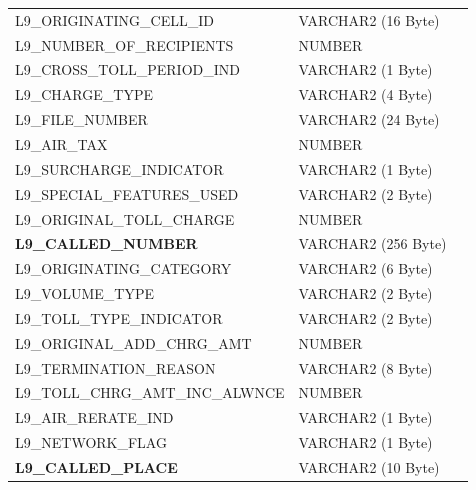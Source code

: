 \documentclass[12pt,twoside]{article}
\begin{document}
\begin{longtable}{lll}
 L9\_ORIGINATING\_CELL\_ID               &  VARCHAR2 (16 Byte)   &                            \\
 L9\_NUMBER\_OF\_RECIPIENTS              &  NUMBER               &                            \\
 L9\_CROSS\_TOLL\_PERIOD\_IND            &  VARCHAR2 (1 Byte)    &                            \\
 L9\_CHARGE\_TYPE                        &  VARCHAR2 (4 Byte)    &                            \\
 L9\_FILE\_NUMBER                        &  VARCHAR2 (24 Byte)   &                            \\
 L9\_AIR\_TAX                            &  NUMBER               &                            \\
 L9\_SURCHARGE\_INDICATOR                &  VARCHAR2 (1 Byte)    &                            \\
 L9\_SPECIAL\_FEATURES\_USED             &  VARCHAR2 (2 Byte)    &                            \\
 L9\_ORIGINAL\_TOLL\_CHARGE              &  NUMBER               &                            \\
 \textbf{L9\_CALLED\_NUMBER}             &  VARCHAR2 (256 Byte)  &                            \\
 L9\_ORIGINATING\_CATEGORY               &  VARCHAR2 (6 Byte)    &                            \\
 L9\_VOLUME\_TYPE                        &  VARCHAR2 (2 Byte)    &                            \\
 L9\_TOLL\_TYPE\_INDICATOR               &  VARCHAR2 (2 Byte)    &                            \\
 L9\_ORIGINAL\_ADD\_CHRG\_AMT            &  NUMBER               &                            \\
 L9\_TERMINATION\_REASON                 &  VARCHAR2 (8 Byte)    &                            \\
 L9\_TOLL\_CHRG\_AMT\_INC\_ALWNCE        &  NUMBER               &                            \\
 L9\_AIR\_RERATE\_IND                    &  VARCHAR2 (1 Byte)    &                            \\
 L9\_NETWORK\_FLAG                       &  VARCHAR2 (1 Byte)    &                            \\
 \textbf{L9\_CALLED\_PLACE}              &  VARCHAR2 (10 Byte)   &                            \\

\end{longtable}
\end{document}
